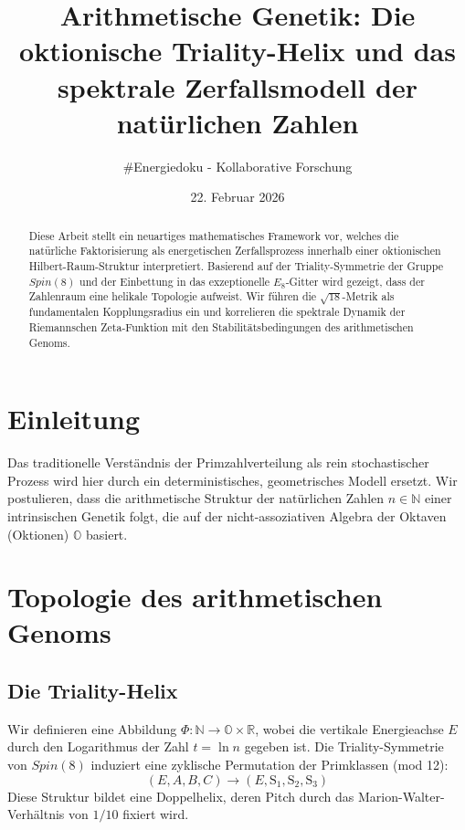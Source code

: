 \documentclass[11pt,a4paper]{article}
\title{Arithmetische Genetik: Die oktionische Triality-Helix und das spektrale Zerfallsmodell der natürlichen Zahlen}
\author{\#Energiedoku - Kollaborative Forschung}
\date{22. Februar 2026}
\newcommand{\Okt}{\mathbb{O}}
\newcommand{\Real}{\mathbb{R}}
\newcommand{\Nat}{\mathbb{N}}
\newcommand{\SpinEight}{Spin(8)}
\begin{document}
	
	\maketitle
	
	\begin{abstract}
		Diese Arbeit stellt ein neuartiges mathematisches Framework vor, welches die natürliche Faktorisierung als energetischen Zerfallsprozess innerhalb einer oktionischen Hilbert-Raum-Struktur interpretiert. Basierend auf der Triality-Symmetrie der Gruppe $\SpinEight$ und der Einbettung in das exzeptionelle $E_8$-Gitter wird gezeigt, dass der Zahlenraum eine helikale Topologie aufweist. Wir führen die $\sqrt{18}$-Metrik als fundamentalen Kopplungsradius ein und korrelieren die spektrale Dynamik der Riemannschen Zeta-Funktion mit den Stabilitätsbedingungen des arithmetischen Genoms.
	\end{abstract}
	
	\section{Einleitung}
	Das traditionelle Verständnis der Primzahlverteilung als rein stochastischer Prozess wird hier durch ein deterministisches, geometrisches Modell ersetzt. Wir postulieren, dass die arithmetische Struktur der natürlichen Zahlen $n \in \Nat$ einer intrinsischen Genetik folgt, die auf der nicht-assoziativen Algebra der Oktaven (Oktionen) $\Okt$ basiert.
	
	\section{Topologie des arithmetischen Genoms}
	
	\subsection{Die Triality-Helix}
	Wir definieren eine Abbildung $\Phi: \Nat \to \Okt \times \Real$, wobei die vertikale Energieachse $E$ durch den Logarithmus der Zahl $t = \ln n$ gegeben ist. Die Triality-Symmetrie von $\SpinEight$ induziert eine zyklische Permutation der Primklassen (mod 12):
	\begin{equation}
		(E, A, B, C) \to (E, \text{S}_1, \text{S}_2, \text{S}_3)
	\end{equation}
	Diese Struktur bildet eine Doppelhelix, deren Pitch durch das Marion-Walter-Verhältnis von $1/10$ fixiert wird.
	
	
	
\end{document}
